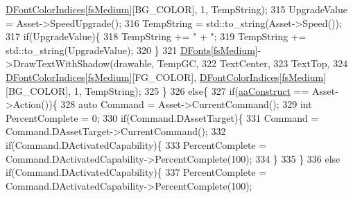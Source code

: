 \begin{DoxyCode}
      \hyperlink{classCUnitDescriptionRenderer_acb9416ccf452db38d4817711cd9d6abb}{DFontColorIndices}[\hyperlink{classCUnitDescriptionRenderer_a3ea4cd83b6dd9533ab3abb953a7da35aa7b5aa12d8a01b317ebfbf1bd65d7e568}{fsMedium}][BG\_COLOR], 1, TempString);
315                         UpgradeValue = Asset->SpeedUpgrade();
316                         TempString = std::to\_string(Asset->Speed());
317                         \textcolor{keywordflow}{if}(UpgradeValue)\{
318                             TempString += \textcolor{stringliteral}{" + "};
319                             TempString += std::to\_string(UpgradeValue);
320                         \}
321                         \hyperlink{classCUnitDescriptionRenderer_a270a545ecdb1602cd2a0a2def8997dc8}{DFonts}[\hyperlink{classCUnitDescriptionRenderer_a3ea4cd83b6dd9533ab3abb953a7da35aa7b5aa12d8a01b317ebfbf1bd65d7e568}{fsMedium}]->DrawTextWithShadow(drawable, TempGC, 
322                             TextCenter, 
323                             TextTop, 
324                             \hyperlink{classCUnitDescriptionRenderer_acb9416ccf452db38d4817711cd9d6abb}{DFontColorIndices}[\hyperlink{classCUnitDescriptionRenderer_a3ea4cd83b6dd9533ab3abb953a7da35aa7b5aa12d8a01b317ebfbf1bd65d7e568}{fsMedium}][FG\_COLOR], 
      \hyperlink{classCUnitDescriptionRenderer_acb9416ccf452db38d4817711cd9d6abb}{DFontColorIndices}[\hyperlink{classCUnitDescriptionRenderer_a3ea4cd83b6dd9533ab3abb953a7da35aa7b5aa12d8a01b317ebfbf1bd65d7e568}{fsMedium}][BG\_COLOR], 1, TempString);
325                     \}
326                     \textcolor{keywordflow}{else}\{
327                         \textcolor{keywordflow}{if}(\hyperlink{GameDataTypes_8h_ab47668e651a3032cfb9c40ea2d60d670a7ef6b863f66dd7dcc95a199cd758ae1d}{aaConstruct} == Asset->Action())\{
328                             \textcolor{keyword}{auto} Command = Asset->CurrentCommand();
329                             \textcolor{keywordtype}{int} PercentComplete = 0;
330                             \textcolor{keywordflow}{if}(Command.DAssetTarget)\{
331                                 Command = Command.DAssetTarget->CurrentCommand();
332                                 \textcolor{keywordflow}{if}(Command.DActivatedCapability)\{
333                                     PercentComplete = Command.DActivatedCapability->PercentComplete(100);
334                                 \}
335                             \}
336                             \textcolor{keywordflow}{else} \textcolor{keywordflow}{if}(Command.DActivatedCapability)\{
337                                 PercentComplete = Command.DActivatedCapability->PercentComplete(100);

\end{DoxyCode}
